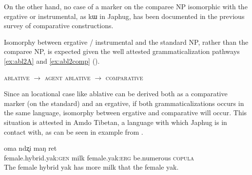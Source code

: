 \documentclass[oldfontcommands,oneside,a4paper,11pt]{article}
\newcommand{\ipa}[1]{{\phon #1}} %
\begin{document}
On the other hand, no case of a marker   on the comparee NP isomorphic with the ergative or instrumental, as \ipa{kɯ} in Japhug, has been documented in the previous survey of comparative constructions.

\begin{table}[h]
\caption{Combination of chapters 98 (Alignment of Case Marking of Full Nouns) and 121 (Comparative constructions) of the WALS} \label{tab:stassen}
\end{table}
 
Isomorphy between ergative / instrumental and the standard NP, rather than the comparee NP, is expected given the well attested grammaticalization pathways \ref{ex:abl2A} and \ref{ex:abl2comp} (\citealt[29]{heine-kuteva02}).
 


\begin{exe}
\ex \label{ex:abl2A}
\glt \textsc{ablative} $\rightarrow$ \textsc{agent} 
\ex \label{ex:abl2comp}
\glt \textsc{ablative} $\rightarrow$ \textsc{comparative}
\end{exe}

Since an locational case like ablative can be derived both as a comparative marker (on the standard) and  an ergative, if both grammaticalizations occurs in the same language, isomorphy between ergative and comparative will occur. This situation is attested in Amdo Tibetan, a language with which Japhug is in contact with, as can be seen in example from \citet[255]{skalbzang02dialectes}.

\begin{exe}
\ex \label{ex:vbris}
\gll \ipa{ndzomi}  	\ipa{oma}  	\ipa{ndʐi}  	\ipa{maŋ}  	\ipa{ret}  \\
female.hybrid.yak:\textsc{gen} milk female.yak:\textsc{erg} be.numerous \textsc{copula} \\
\glt The female hybrid yak has more milk that the female yak. 
\end{exe}
\end{document}
